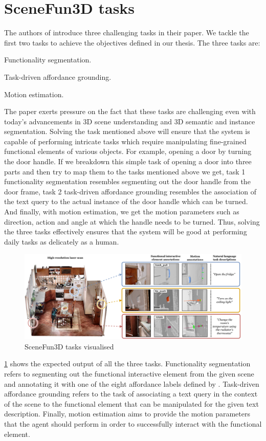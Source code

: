\section{SceneFun3D tasks}
The authors of \cite{delitzas2024scenefun3d} introduce three challenging tasks in their paper. We tackle the first two tasks to achieve the 
objectives defined in our thesis. The three tasks are:
\begin{compactenum}[1.]
\item	Functionality segmentation.
\item	Task-driven affordance grounding.
\item	Motion estimation.
\end{compactenum}
The paper exerts pressure on the fact that these tasks are challenging even with today's advancements in 3D scene understanding
and 3D semantic and instance segmentation. Solving the task mentioned above will ensure that the system is capable of 
performing intricate tasks which require manipulating fine-grained functional elements of various objects.
For example, opening a door by turning the door handle. If we breakdown this simple task of opening a door into three parts
and then try to map them to the tasks mentioned above we get, task 1 functionality segmentation resembles segmenting out the door handle 
from the door frame, task 2 task-driven affordance grounding resembles the association of the text query to the actual 
instance of the door handle which can be turned. And finally, with motion estimation, we get the motion parameters such as direction, action and angle 
at which the handle needs to be turned. Thus, solving the three tasks effectively ensures that the system will be good at performing daily
tasks as delicately as a human. \\
\begin{figure}[ht!]
    \centering
    \includegraphics[width=\textwidth]{content/images/SceneFun3D.png}
    \caption{SceneFun3D tasks visualised \cite{delitzas2024scenefun3d}}
    \label{fig:your_image_label}
\end{figure}
\cref{fig:your_image_label} shows the expected output of all the three tasks. Functionality segmentation refers to segmenting out the functional interactive 
element from the given scene and annotating it with one of the eight affordance labels defined by \cite{gibson}. Task-driven affordance grounding refers to the task
of associating a text query in the context of the scene to the functional element that can be manipulated for the given text description. Finally, motion estimation
aims to provide the motion parameters that the agent should perform in order to successfully interact with the functional element.

